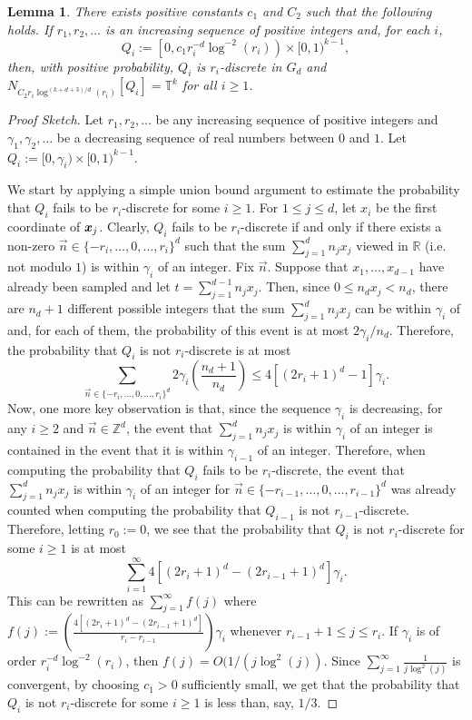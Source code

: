 \documentclass[12pt,a4paper]{amsart}
\numberwithin{equation}{section}
\newtheorem{lemma}[equation]{Lemma}
\theoremstyle{definition}
\begin{document}
\begin{lemma}
\label{lem:stripLem}
There exists positive constants $c_1$ and $C_2$ such that the following holds. If $r_1,r_2,\dots$ is an increasing sequence of positive integers and, for each $i$,  
\[Q_i:=\left[0, c_1r_i^{-d}\log^{-2}(r_i)\right)\times [0,1)^{k-1},\]
then, with positive probability, $Q_i$ is $r_i$-discrete in $G_d$ and $N_{C_2r_i\log^{(k+d+3)/d}(r_i)}[Q_{i}]=\mathbb{T}^k$ for all $i\geq1$.
\end{lemma}

\begin{proof}[Proof Sketch]
Let $r_1,r_2,\dots$ be any increasing sequence of positive integers and $\gamma_1,\gamma_2,\dots$ be a decreasing sequence of real numbers between $0$ and $1$. Let $Q_i:=[0,\gamma_i)\times [0,1)^{k-1}$. 

We start by applying a simple union bound argument to estimate the probability that $Q_i$ fails to be $r_i$-discrete for some $i\geq1$. For $1\leq j\leq d$, let $x_i$ be the first coordinate of $\boldsymbol{x}_j$. Clearly, $Q_i$ fails to be $r_i$-discrete if and only if there exists a non-zero $\vec{n}\in\{-r_i,\dots,0,\dots,r_i\}^d$ such that the sum $\sum_{j=1}^dn_j x_j$ viewed in $\mathbb{R}$ (i.e. not modulo $1$) is within $\gamma_i$ of an integer. Fix $\vec{n}$. Suppose that $x_1,\dots,x_{d-1}$ have already been sampled and let $t=\sum_{j=1}^{d-1}n_jx_j$. Then, since $0\leq n_dx_j<n_d$, there are $n_d+1$ different possible integers that the sum $\sum_{j=1}^dn_j x_j$ can be within $\gamma_i$ of and, for each of them, the probability of this event is at most $2\gamma_i/n_d$. Therefore, the probability that $Q_i$ is not $r_i$-discrete is at most
\[\sum_{\vec{n}\in\{-r_i,\dots,0,\dots,r_i\}^d}2\gamma_i\left(\frac{n_d+1}{n_d}\right) \leq 4\left[(2r_i+1)^d-1\right]\gamma_i.\]
Now, one more key observation is that, since the sequence $\gamma_i$ is decreasing, for any $i\geq2$ and $\vec{n}\in \mathbb{Z}^d$, the event that $\sum_{j=1}^dn_j x_j$ is within $\gamma_i$ of an integer is contained in the event that it is within $\gamma_{i-1}$ of an integer. Therefore, when computing the probability that $Q_i$ fails to be $r_i$-discrete, the event that $\sum_{j=1}^dn_jx_j$ is within $\gamma_i$ of an integer for $\vec{n}\in\{-r_{i-1},\dots,0,\dots,r_{i-1}\}^d$ was already counted when computing the probability that $Q_{i-1}$ is not $r_{i-1}$-discrete. Therefore, letting $r_0:=0$, we see that the probability that $Q_i$ is not $r_i$-discrete for some $i\geq1$ is at most
\[\sum_{i=1}^\infty 4\left[(2r_i+1)^d - (2r_{i-1}+1)^d\right]\gamma_i.\]
This can be rewritten as $\sum_{j=1}^\infty f(j)$ where  $f(j):=\left(\frac{4\left[(2r_i+1)^d - (2r_{i-1}+1)^d\right]}{r_i-r_{i-1}}\right)\gamma_i$ whenever $r_{i-1}+1\leq j\leq r_i$. If $\gamma_i$ is of order $r_i^{-d}\log^{-2}(r_i)$, then $f(j)=O(1/(j\log^2(j))$. Since $\sum_{j=1}^\infty \frac{1}{j\log^2(j)}$ is convergent, by choosing $c_1>0$ sufficiently small, we get that the probability that $Q_i$ is not $r_i$-discrete for some $i\geq1$ is less than, say, $1/3$. 


\end{proof}
\end{document}
